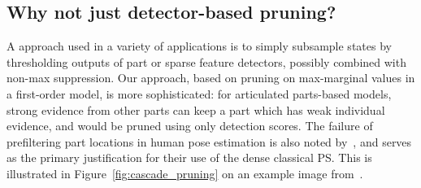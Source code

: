 \subsection{Why not just detector-based pruning?} A \naive approach used in a 
variety of applications is to simply subsample states by thresholding outputs 
of part or sparse feature detectors, possibly combined with non-max 
suppression.  Our approach, based on pruning on max-marginal values in a 
first-order model, is more sophisticated: for articulated parts-based models, 
strong evidence from other parts can keep a part which has weak individual 
evidence, and would be pruned using only detection scores.  The failure of 
prefiltering  part locations in human pose estimation is also noted 
by~\cite{andriluka09}, and serves as the primary justification for their use of 
the dense classical PS.  This is illustrated in 
Figure~\ref{fig:cascade_pruning} on an example image from~\cite{ferrari08}.


